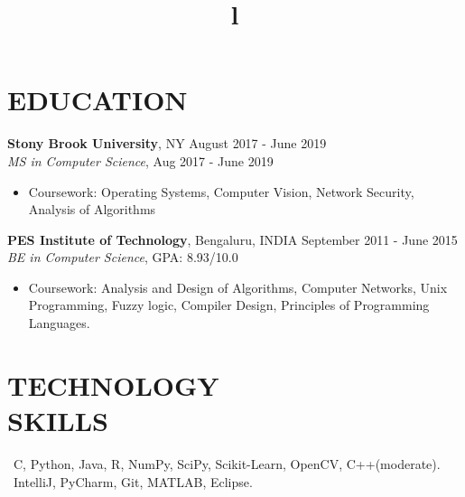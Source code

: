 \documentclass[margin]{res}
\begin{document}
\begin{resume}

\section{EDUCATION}
\textbf{Stony Brook University}, NY  \hfill August 2017 - June 2019 \\
{\sl MS in Computer Science}, Aug 2017 - June 2019 
\begin{itemize}
\item Coursework: Operating Systems, Computer Vision, Network Security, Analysis of Algorithms
\end{itemize}
\textbf{PES Institute of Technology}, Bengaluru, INDIA \hfill September 2011 - June 2015 \\
{\sl BE in Computer Science},  \hfill GPA: 8.93/10.0 
\begin{itemize}
\item Coursework: Analysis and Design of Algorithms, Computer Networks, Unix Programming, Fuzzy logic, Compiler Design, Principles of Programming Languages. 
\end{itemize}
 


\section{TECHNOLOGY \\ SKILLS} 

\ C, Python, Java, R, NumPy, SciPy, Scikit-Learn, OpenCV, C++(moderate). \\
\ IntelliJ, PyCharm, Git, MATLAB, Eclipse.\\

\begin{format}
\title{l}\\
\\
\body\\
\end{format}

\end{resume}
\end{document}
